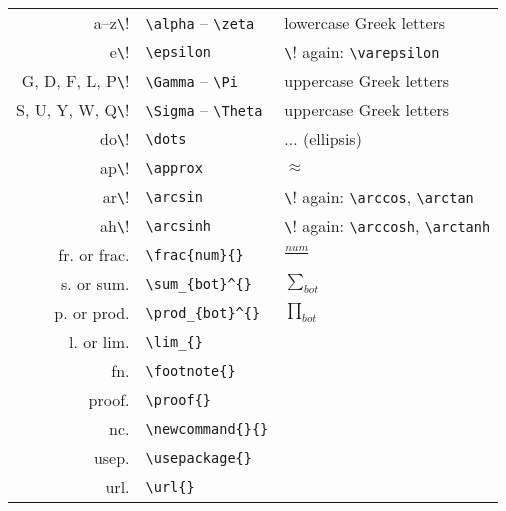 \documentclass[10pt]{article}
\begin{document}
\begin{table}
\begin{tabular}{r|l|l}
	a--z\cmdkey\verb!\!       & \verb!\alpha! -- \verb!\zeta!    & lowercase Greek letters   \\
	e\cmdkey\verb!\!          & \verb!\epsilon!                  & \cmdkey\verb!\! again: \verb!\varepsilon!                     \\
	G, D, F, L, P\cmdkey\verb!\! &  \verb!\Gamma! -- \verb!\Pi!    & uppercase Greek letters \\
	S, U, Y, W, Q\cmdkey\verb!\! &  \verb!\Sigma! -- \verb!\Theta! & uppercase Greek letters \\
	do\cmdkey\verb!\!         & \verb!\dots!                     & $\dots$ (ellipsis)        \\
	ap\cmdkey\verb!\!         & \verb!\approx!                   & $\approx$                 \\
	ar\cmdkey\verb!\!         & \verb!\arcsin!                   & \cmdkey\verb!\! again: \verb!\arccos!, \verb!\arctan!       \\
	ah\cmdkey\verb!\!         & \verb!\arcsinh!                  & \cmdkey\verb!\! again: \verb!\arccosh!, \verb!\arctanh!     \\
	\hline
	fr\ctlkey\shiftkey. or frac\ctlkey\shiftkey.    & \verb!\frac{num}{}!              & $\frac{num}{}$      \\
	s\ctlkey\shiftkey. or sum\ctlkey\shiftkey.      & \verb!\sum_{bot}^{}!             & $\sum_{bot}^{}$     \\ 
	p\ctlkey\shiftkey. or prod\ctlkey\shiftkey.     & \verb!\prod_{bot}^{}!            & $\prod_{bot}^{}$    \\ 
	l\ctlkey\shiftkey. or lim\ctlkey\shiftkey.      & \verb!\lim_{}!                   &    \\
	fn\ctlkey\shiftkey.                             & \verb!\footnote{}!               &    \\ 
	proof\ctlkey\shiftkey.                          & \verb!\proof{}!                  &    \\
	nc\ctlkey\shiftkey.                             & \verb!\newcommand{}{}!           &    \\
	usep\ctlkey\shiftkey.                           & \verb!\usepackage{}!             &    \\
	url\ctlkey\shiftkey.                            & \verb!\url{}!                    &    \\

\end{tabular}
\label{tab:keyboard_shortcuts}
\end{table}
\end{document}
